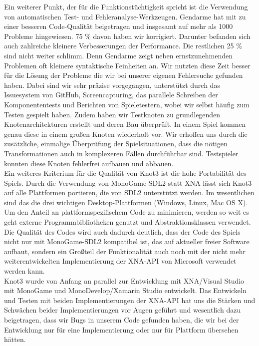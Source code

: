 Ein weiterer Punkt, der für die Funktionstüchtigkeit spricht ist die Verwendung von automatischen Test- und Fehleranalyse-Werkzeugen. Gendarme hat mit zu einer besseren Code-Qualität beigetragen und insgesamt auf mehr als 1000 Probleme hingewiesen. 75 \% davon haben wir korrigiert. Darunter befanden sich auch zahlreiche kleinere Verbesserungen der Performance. Die restlichen 25 \% sind nicht weiter schlimm. Denn Gendarme zeigt neben ernstzunehmenden Problemen oft kleinere syntaktische Feinheiten an. Wir nutzten diese Zeit besser für die Lösung der Probleme die wir bei unserer eigenen Fehlersuche gefunden haben. Dabei sind wir sehr präzise vorgegangen, unterstützt durch das Issuesystem von GitHub, Screencapturing, das parallele Schreiben der Komponententests und Berichten von Spieletestern, wobei wir selbst häufig zum Testen gespielt haben. Zudem haben wir Testknoten zu grundlegenden Knotenarchitekturen erstellt und deren Bau überprüft. In einem Spiel kommen genau diese in einem großen Knoten wiederholt vor. Wir erhoffen uns durch die zusätzliche, einmalige Überprüfung der Spielsituationen, dass die nötigen Transformationen auch in komplexeren Fällen durchführbar sind. Testspieler konnten diese Knoten fehlerfrei aufbauen und abbauen.\\

Ein weiteres Kriterium für die Qualität von Knot3 ist die hohe Portabilität des Spiels. Durch die Verwendung von MonoGame-SDL2 statt XNA lässt sich Knot3 auf alle Plattformen portieren, die von SDL2 unterstützt werden. Im wesentlichen sind das die drei wichtigen Desktop-Plattformen (Windows, Linux, Mac OS X).\\

Um den Anteil an plattformspezifischem Code zu minimieren, werden so weit es geht externe Programmbibliotheken genutzt und Abstraktionsklassen verwendet. Die Qualität des Codes wird auch dadurch deutlich, dass der Code des Spiels nicht nur mit MonoGame-SDL2 kompatibel ist, das auf aktueller freier Software aufbaut, sondern ein Großteil der Funktionalität auch noch mit der nicht mehr weiterentwickelten Implementierung der XNA-API von Microsoft verwendet werden kann.\\

Knot3 wurde von Anfang an parallel zur Entwicklung mit XNA/Visual Studio mit MonoGame und MonoDevelop/Xamarin Studio entwickelt. Das Entwickeln und Testen mit beiden Implementierungen der XNA-API hat uns die Stärken und Schwächen beider Implementierungen vor Augen geführt und wesentlich dazu beigetragen, dass wir Bugs in unserem Code gefunden haben, die wir bei der Entwicklung nur für eine Implementierung oder nur für Plattform übersehen hätten.\\


